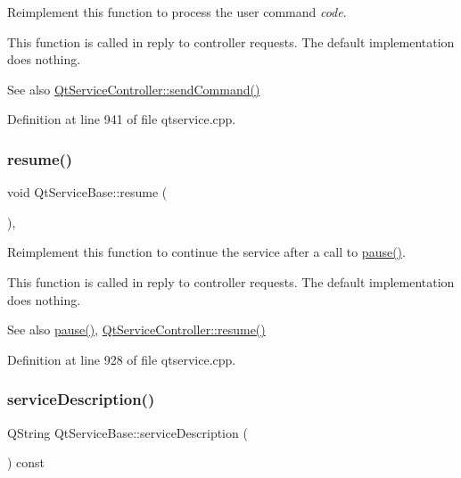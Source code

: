 Reimplement this function to process the user command {\itshape code}.

This function is called in reply to controller requests. The default implementation does nothing.

\begin{DoxySeeAlso}{See also}
\mbox{\hyperlink{class_qt_service_controller_a1428c7d51403416bc7663ae37c446cfc}{Qt\+Service\+Controller\+::send\+Command()}} 
\end{DoxySeeAlso}


Definition at line 941 of file qtservice.\+cpp.

\mbox{\label{class_qt_service_base_aaa2e05ef1c36283b6b35348c3972b489}} 
\subsubsection{\texorpdfstring{resume()}{resume()}}
{\footnotesize\ttfamily void Qt\+Service\+Base\+::resume (\begin{DoxyParamCaption}{ }\end{DoxyParamCaption})\hspace{0.3cm}{\ttfamily [protected]}, {\ttfamily [virtual]}}

Reimplement this function to continue the service after a call to \mbox{\hyperlink{class_qt_service_base_a43215a7c5c047d30bcf4f697e6691f89}{pause()}}.

This function is called in reply to controller requests. The default implementation does nothing.

\begin{DoxySeeAlso}{See also}
\mbox{\hyperlink{class_qt_service_base_a43215a7c5c047d30bcf4f697e6691f89}{pause()}}, \mbox{\hyperlink{class_qt_service_controller_a2d71eab6146427fc7b431386bf72eaec}{Qt\+Service\+Controller\+::resume()}} 
\end{DoxySeeAlso}


Definition at line 928 of file qtservice.\+cpp.

\mbox{\label{class_qt_service_base_a6cf3ef7bc5d85acb31e99a85fde47397}} 
\subsubsection{\texorpdfstring{service\+Description()}{serviceDescription()}}
{\footnotesize\ttfamily Q\+String Qt\+Service\+Base\+::service\+Description (\begin{DoxyParamCaption}{ }\end{DoxyParamCaption}) const}

